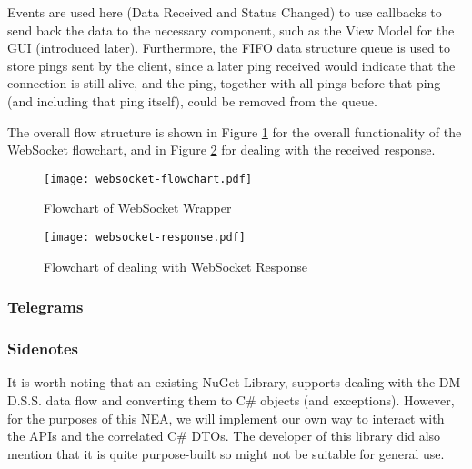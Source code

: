 Events are used here (Data Received and Status Changed) to use callbacks to send back the data to the necessary component, such as the View Model for the GUI (introduced later). Furthermore, the FIFO data structure queue is used to store pings sent by the client, since a later ping received would indicate that the connection is still alive, and the ping, together with all pings before that ping (and including that ping itself), could be removed from the queue.

The overall flow structure is shown in Figure \ref{fig:websocket-flowchart} for the overall functionality of the WebSocket flowchart, and in Figure \ref{fig:websocket-response} for dealing with the received response.

\begin{figure}
    \centering
    \texttt{[image: websocket-flowchart.pdf]}
    \caption{Flowchart of WebSocket Wrapper}
    \label{fig:websocket-flowchart}
\end{figure}

\begin{figure}
    \centering
    \texttt{[image: websocket-response.pdf]}
    \caption{Flowchart of dealing with WebSocket Response}
    \label{fig:websocket-response}
\end{figure}

\subsubsection{Telegrams}






\subsubsection{Sidenotes}

It is worth noting that an existing NuGet Library,  supports dealing with the DM-D.S.S. data flow and converting them to C\# objects (and exceptions). However, for the purposes of this NEA, we will implement our own way to interact with the APIs and the correlated C\# DTOs. The developer of this library did also mention that it is quite purpose-built so might not be suitable for general use.

